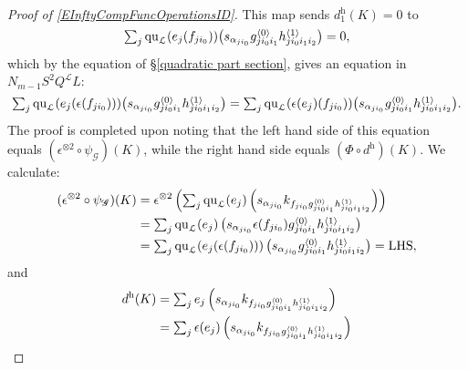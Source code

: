 \documentclass[11pt]{amsart} \renewcommand{\baselinestretch}{1.2}
\theoremstyle{plain}
\theoremstyle{definition}
\newcommand{\scrG}{\mathscr{G}}
\newcommand{\calL}{\mathcal{L}}
\newcommand{\call}{\mathcal{L}}
\newcommand{\BSW}{{\scrG}}
\newcommand{\quadratic}{\mathrm{qu}}
\newcommand{\uhor}{^\mathrm{h}}
\begin{document}
\begin{Operations in composite functor spectral sequences}
\begin{proof}[Proof of \ref{EInftyCompFuncOperationsID}]
This map sends $d\uhor_1(K)=0$ to %
\[
\textstyle\sum_j {\quadratic_\call}(e_j(f_{ji_0}))\smash{\left(s_{\alpha_{ji_0}} {g^{\smash{\langle} 0\smash{\rangle}}_{ji_0i_1}h^{\smash{\langle} 1\smash{\rangle}}_{ji_0i_1i_2}}\right)}=0, \]
which by the equation of \S\ref{quadratic part section}, gives an equation in $N_{m-1}S^2Q^{\calL}L$:
\[\textstyle\sum_j {\quadratic_\call}(e_j(\epsilon (f_{ji_0})))\smash{\left(s_{\alpha_{ji_0}} {g^{\smash{\langle} 0\smash{\rangle}}_{ji_0i_1}h^{\smash{\langle} 1\smash{\rangle}}_{ji_0i_1i_2}}\right)}
=
\textstyle\sum_j {\quadratic_\call}(\epsilon (e_j)(f_{ji_0}))\smash{\left(s_{\alpha_{ji_0}} {g^{\smash{\langle} 0\smash{\rangle}}_{ji_0i_1}h^{\smash{\langle} 1\smash{\rangle}}_{ji_0i_1i_2}}\right)}.
\]
The proof is completed upon noting that the left hand side of this equation equals $(\epsilon^{\otimes 2}\circ \psi_\BSW)(K)$, while the right hand side equals $(\Phi\circ d\uhor)(K)$. We calculate:
\begin{alignat*}{2}
(\epsilon^{\otimes 2}\circ \psi_\BSW)(K)
&=
\epsilon^{\otimes 2}\left(\textstyle\sum_j {\quadratic_\call}(e_j)\left(s_{\alpha_{ji_0}} k_{f\relax _{ji_0}g^{\smash{\langle} 0\smash{\rangle}}_{ji_0i_1}h^{\smash{\langle} 1\smash{\rangle}}_{ji_0i_1i_2}}\right)\right)%
\\
&=
\textstyle\sum_j {\quadratic_\call}(e_j)\left(s_{\alpha_{ji_0}} \epsilon(f\relax _{ji_0})g^{\smash{\langle} 0\smash{\rangle}}_{ji_0i_1}h^{\smash{\langle} 1\smash{\rangle}}_{ji_0i_1i_2}\right)%
\\
&=
\textstyle\sum_j {\quadratic_\call}(e_j(\epsilon (f_{ji_0})))\left(s_{\alpha_{ji_0}} g^{\smash{\langle} 0\smash{\rangle}}_{ji_0i_1}h^{\smash{\langle} 1\smash{\rangle}}_{ji_0i_1i_2}\right)=\textup{LHS},
\end{alignat*}
and
\begin{alignat*}{2}
d\uhor(K)
&=
\textstyle\sum_j e_j\left(s_{\alpha_{ji_0}} k_{f\relax _{ji_0}g^{\smash{\langle} 0\smash{\rangle}}_{ji_0i_1}h^{\smash{\langle} 1\smash{\rangle}}_{ji_0i_1i_2}}\right)%
\\
&=
\textstyle\sum_j \epsilon (e_j)\left(s_{\alpha_{ji_0}} k_{f\relax _{ji_0}g^{\smash{\langle} 0\smash{\rangle}}_{ji_0i_1}h^{\smash{\langle} 1\smash{\rangle}}_{ji_0i_1i_2}}\right)%

\end{alignat*}
\end{proof}
\end{Operations in composite functor spectral sequences}
\end{document}

